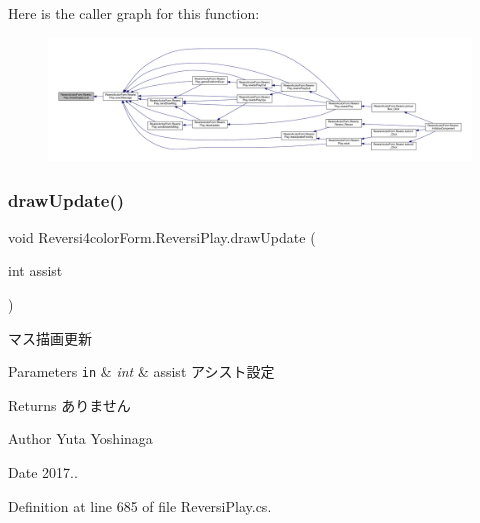 Here is the caller graph for this function\+:
\nopagebreak
\begin{figure}[H]
\begin{center}
\leavevmode
\includegraphics[width=350pt]{class_reversi4color_form_1_1_reversi_play_aad21cdb2b475bc1d65ab32bca755f24f_icgraph}
\end{center}
\end{figure}
\mbox{\label{class_reversi4color_form_1_1_reversi_play_a61428c9797c95359b397564d0bcfa7e7}} 
\subsubsection{\texorpdfstring{draw\+Update()}{drawUpdate()}}
{\footnotesize\ttfamily void Reversi4color\+Form.\+Reversi\+Play.\+draw\+Update (\begin{DoxyParamCaption}\item[{int}]{assist }\end{DoxyParamCaption})}



マス描画更新 


\begin{DoxyParams}[1]{Parameters}
\mbox{\tt in}  & {\em int} & assist アシスト設定 \\
\hline
\end{DoxyParams}
\begin{DoxyReturn}{Returns}
ありません 
\end{DoxyReturn}
\begin{DoxyAuthor}{Author}
Yuta Yoshinaga 
\end{DoxyAuthor}
\begin{DoxyDate}{Date}
2017.. 
\end{DoxyDate}


Definition at line 685 of file Reversi\+Play.\+cs.



